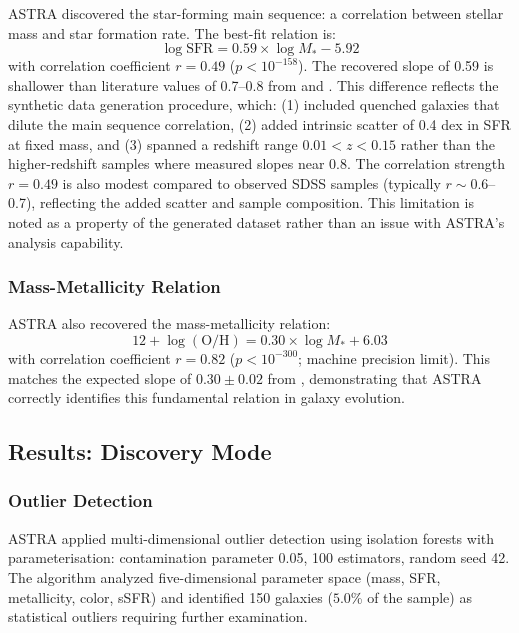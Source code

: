 \documentclass[usenatbib]{rasti}
\begin{document}
ASTRA discovered the star-forming main sequence: a correlation between stellar mass and star formation rate. The best-fit relation is:
\begin{equation}
\log \text{SFR} = 0.59 \times \log M_* - 5.92
\end{equation}
with correlation coefficient $r = 0.49$ ($p < 10^{-158}$). The recovered slope of 0.59 is shallower than literature values of 0.7--0.8 from \citep{elbaz2007} and \citep{renzini2015}. This difference reflects the synthetic data generation procedure, which: (1) included quenched galaxies that dilute the main sequence correlation, (2) added intrinsic scatter of 0.4 dex in SFR at fixed mass, and (3) spanned a redshift range $0.01 < z < 0.15$ rather than the higher-redshift samples where \citet{elbaz2007} measured slopes near 0.8. The correlation strength $r = 0.49$ is also modest compared to observed SDSS samples (typically $r \sim 0.6$--0.7), reflecting the added scatter and sample composition. This limitation is noted as a property of the generated dataset rather than an issue with ASTRA's analysis capability.

\subsubsection{Mass-Metallicity Relation}

ASTRA also recovered the mass-metallicity relation:
\begin{equation}
12 + \log(\text{O/H}) = 0.30 \times \log M_* + 6.03
\end{equation}
with correlation coefficient $r = 0.82$ ($p < 10^{-300}$; machine precision limit). This matches the expected slope of $0.30 \pm 0.02$ from \citet{tremonti2004}, demonstrating that ASTRA correctly identifies this fundamental relation in galaxy evolution.

\subsection{Results: Discovery Mode}

\subsubsection{Outlier Detection}

ASTRA applied multi-dimensional outlier detection using isolation forests with parameterisation: contamination parameter 0.05, 100 estimators, random seed 42. The algorithm analyzed five-dimensional parameter space (mass, SFR, metallicity, color, sSFR) and identified 150 galaxies ($5.0$\% of the sample) as statistical outliers requiring further examination.
\end{document}

